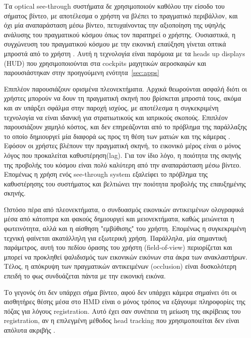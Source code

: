 Τα optical see-through συστήματα δε χρησιμοποιούν καθόλου την είσοδο του σήματος βίντεο, με αποτέλεσμα ο χρήστη να βλέπει το πραγματικό περιβάλλον, και όχι μία αναπαράσταση μέσω βίντεο, πετυχαίνοντας την αξιοποίηση της υψηλής ανάλυσης του πραγματικού κόσμου όπως τον παρατηρεί ο χρήστης. Ουσιαστικά, η συγχώνευση του πραγματικού κόσμου με την εικονική επαύξηση γίνεται οπτικά μπροστά από το χρήστη \cite{Vallino1998} . Αυτή η τεχνολογία είναι παρόμοια με τα  heads up displays (HUD) που χρησιμοποιούνται στα cockpits μαχητικών αεροσκαφών και παρουσιάστηκαν στην προηγούμενη ενότητα~\ref{sec:apps}


Επιπλέον παρουσιάζουν ορισμένα πλεονεκτήματα. Αρχικά θεωρούνται ασφαλή διότι οι χρήστες μπορούν να δουν τη πραγματική σκηνή που βρίσκεται μπροστά τους, ακόμα και αν υπάρξει σφάλμα στην παροχή ισχύος, με αποτέλεσμα η συγκεκριμένη τεχνολογία να είναι ιδανική για στρατιωτικούς και ιατρικούς σκοπούς. Επιπλέον παρουσιάζουν χαμηλό κόστος, και δεν επηρεάζονται από το πρόβλημα της παράλλαξης το οποίο δημιουργεί μία διαφορά ως προς τη θέση των ματιών και της κάμερας \cite{krevelen2010}. Εφόσον οι χρήστες βλέπουν την πραγματική σκηνή, το εικονικό μέρος είναι ο μόνος λόγος που προκαλείται καθυστέρηση(lag). Για τον ίδιο λόγο, η ποιότητα της σκηνής της προβολής του κόσμου είναι πολύ καλύτερη από την αναπαράσταση μέσω βίντεο. Επομένως η χρήση ενός see-through system εξαλείφει το πρόβλημα της καθυστέρησης του συστήματος και βελτιώνει την ποιότητα προβολής της επαυξημένης σκηνής. 


Ωστόσο πέρα από πλεονεκτήματα, ο συνδυασμός εικονικών αντικειμένων ολογραφικά μέσα από κάτοπτρα και φακούς δημιουργεί και μειονεκτήματα, καθώς μειώνεται η φωτεινότητα, αλλά και η αίσθηση "εμβύθισης" του χρήστη. Επομένως η συγκεκριμένη τεχνική φαίνεται ακατάλληλη για εξωτερική χρήση. Παράλληλα, μία σημαντική παράμετρος, αυτή του πεδίου όρασης του χρήστη (field-of-view) περιορίζεται και μπορεί να προκληθεί ψαλιδισμός των εικονικών εικόνων στα άκρα των ανακλαστήρων. Τέλος, η απόκρυψη των πραγματικών αντικειμένων (occlusion) είναι δυσκολότερη επειδή το φως συνδυάζεται πάντα με την εικονική εικόνα. 


Το γεγονός ότι δεν υπάρχει σήμα βίντεο, αφού δεν υπάρχει κάμερα σημαίνει ότι οι αισθητήρες θέσης μέσα στο HMD είναι ο μόνος τρόπος να εξάγουμε πληροφορίες της πόζας για λόγους registration. Αυτό έχει σαν συνέπεια τη μείωση της ακρίβειας του registration, αν η επιλεγμένη μέθοδος head tracking που χρησιμοποιείται δεν είναι απόλυτα ακριβής \cite{Malik2002}.

